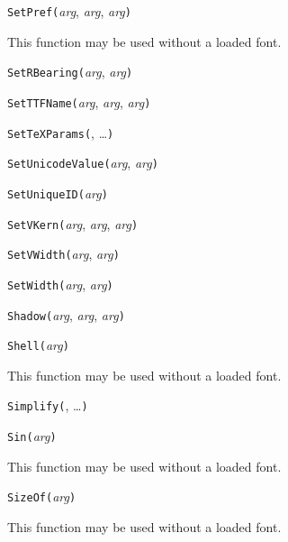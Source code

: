 
\noindent\texttt{SetPref(}\textit{arg}, \textit{arg}, \textit{arg}\texttt{)}

This function may be used without a loaded font.


\noindent\texttt{SetRBearing(}\textit{arg}, \textit{arg}\texttt{)}


\noindent\texttt{SetTTFName(}\textit{arg}, \textit{arg}, \textit{arg}\texttt{)}


\noindent\texttt{SetTeXParams(}, \ldots\texttt{)}


\noindent\texttt{SetUnicodeValue(}\textit{arg}, \textit{arg}\texttt{)}


\noindent\texttt{SetUniqueID(}\textit{arg}\texttt{)}


\noindent\texttt{SetVKern(}\textit{arg}, \textit{arg}, \textit{arg}\texttt{)}


\noindent\texttt{SetVWidth(}\textit{arg}, \textit{arg}\texttt{)}


\noindent\texttt{SetWidth(}\textit{arg}, \textit{arg}\texttt{)}


\noindent\texttt{Shadow(}\textit{arg}, \textit{arg}, \textit{arg}\texttt{)}


\noindent\texttt{Shell(}\textit{arg}\texttt{)}

This function may be used without a loaded font.


\noindent\texttt{Simplify(}, \ldots\texttt{)}


\noindent\texttt{Sin(}\textit{arg}\texttt{)}

This function may be used without a loaded font.


\noindent\texttt{SizeOf(}\textit{arg}\texttt{)}

This function may be used without a loaded font.

